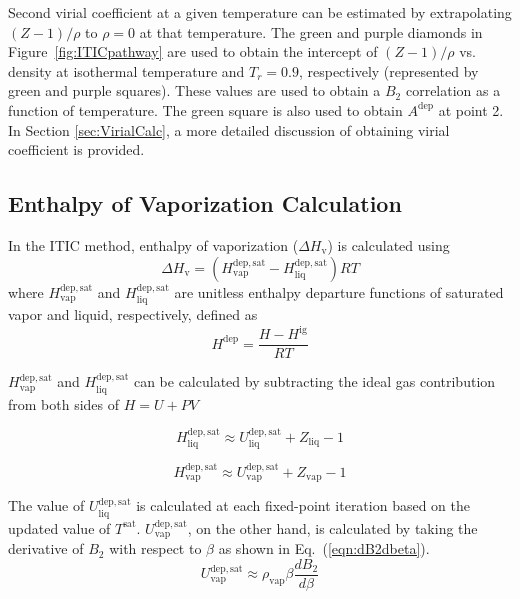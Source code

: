 \documentclass[5p,times]{elsarticle}
\begin{document}
Second virial coefficient at a given temperature can be estimated by extrapolating $(Z-1)/\rho$ to $\rho=0$ at that temperature. The green and purple diamonds in Figure~\ref{fig:ITICpathway} are used to obtain the intercept of $(Z-1)/\rho$ vs. density at isothermal temperature and $T_r=0.9$, respectively (represented by green and purple squares). These values are used to obtain a $B_2$ correlation as a function of temperature. The green square is also used to obtain $A^\mathrm{dep}$ at point 2. In Section \ref{sec:VirialCalc}, a more detailed discussion of obtaining virial coefficient is provided.

\subsection{Enthalpy of Vaporization Calculation}\label{sec:HvapCalc}
In the ITIC method, enthalpy of vaporization ($\Delta H_\mathrm{v}$) is calculated using
\begin{equation}
\Delta H_\mathrm{v}= ( H^{\mathrm{dep,sat}}_\mathrm{vap} - H^{\mathrm{dep,sat}}_\mathrm{liq})RT
\label{eqn:Hvap}
\end{equation}
where $H^{\mathrm{dep,sat}}_\mathrm{vap}$ and $H^{\mathrm{dep,sat}}_\mathrm{liq}$ are unitless enthalpy departure functions of saturated vapor and liquid, respectively, defined as
\begin{equation}
H^{\mathrm{dep}}=\frac{H-H^{\mathrm{ig}}}{RT}
\label{hdep}
\end{equation}

$H^{\mathrm{dep,sat}}_\mathrm{vap}$ and $H^{\mathrm{dep,sat}}_\mathrm{liq}$  can be calculated by subtracting the ideal gas contribution from both sides of $H=U+PV$

\begin{equation}
H^{\mathrm{dep,sat}}_\mathrm{liq} \approx U^{\mathrm{dep, sat}}_\mathrm{liq}+Z_\mathrm{liq} - 1
\label{eqn:HsatLiq}
\end{equation}

\begin{equation}
H^{\mathrm{dep,sat}}_\mathrm{vap} \approx U^{\mathrm{dep, sat}}_\mathrm{vap}+Z_\mathrm{vap} - 1
\label{eqn:HsatVap}
\end{equation}

The value of $U^{\mathrm{dep, sat}}_\mathrm{liq}$ is calculated at each fixed-point iteration based on the updated value of $T^{\mathrm{sat}}$. $U^{\mathrm{dep, sat}}_\mathrm{vap}$, on the other hand, is calculated by taking the derivative of $B_2$ with respect to $\beta$ as shown in Eq.~(\ref{eqn:dB2dbeta}).
\begin{equation}
U^{\mathrm{dep, sat}}_\mathrm{vap}\approx \rho_{\mathrm{vap}} \beta \frac{dB_2}{d\beta}
\label{eqn:dB2dbeta}
\end{equation}
\end{document}
